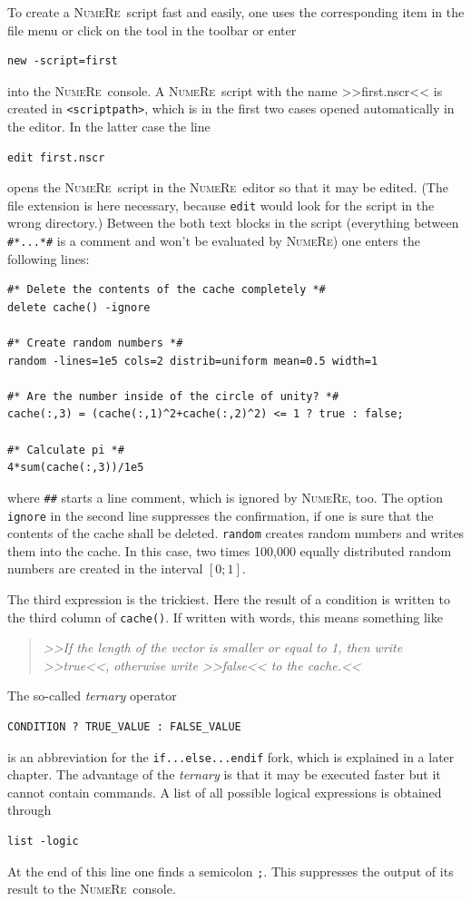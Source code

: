 \documentclass[DIV=14,headsepline,footsepline]{scrbook}
\newcommand{\NR}{\textsc{Nu\-me\-Re}}
\begin{document}
				To create a \NR\ script fast and easily, one uses the corresponding item in the file menu or click on the tool in the toolbar or enter 
				\begin{lstlisting}
new -script=first
				\end{lstlisting}
				into the \NR\ console. A \NR\ script with the name >>first.nscr<< is created in \verb+<scriptpath>+, which is in the first two cases opened automatically in the editor. In the latter case the line
				\begin{lstlisting}
edit first.nscr
				\end{lstlisting}
				opens the \NR\ script in the \NR\ editor so that it may be edited. (The file extension is here necessary, because \verb+edit+ would look for the script in the wrong directory.) Between the both text blocks in the script (everything between \verb+#*...*#+ is a comment and won't be evaluated by \NR) one enters the following lines:
				\begin{lstlisting}
#* Delete the contents of the cache completely *#
delete cache() -ignore

#* Create random numbers *#
random -lines=1e5 cols=2 distrib=uniform mean=0.5 width=1

#* Are the number inside of the circle of unity? *#
cache(:,3) = (cache(:,1)^2+cache(:,2)^2) <= 1 ? true : false;

#* Calculate pi *#
4*sum(cache(:,3))/1e5
				\end{lstlisting}
				where \verb+##+ starts a line comment, which is ignored by \NR, too. The option \verb+ignore+ in the second line suppresses the confirmation, if one is sure that the contents of the cache shall be deleted. \verb+random+ creates random numbers and writes them into the cache. In this case, two times 100,000 equally distributed random numbers are created in the interval $[0;1]$.
				
				The third expression is the trickiest. Here the result of a condition is written to the third column of \verb+cache()+. If written with words, this means something like
				\begin{quotation}
					\noindent\emph{>>If the length of the vector is smaller or equal to 1, then write >>true<<, otherwise write >>false<< to the cache.<<}
				\end{quotation}
				The so-called \emph{ternary} operator
				\begin{lstlisting}
CONDITION ? TRUE_VALUE : FALSE_VALUE
				\end{lstlisting}
				is an abbreviation for the \verb+if...else...endif+ fork, which is explained in a later chapter. The advantage of the \emph{ternary} is that it may be executed faster but it cannot contain commands. A list of all possible logical expressions is obtained through
				\begin{lstlisting}
list -logic
				\end{lstlisting}
				At the end of this line one finds a semicolon \verb+;+. This suppresses the output of its result to the \NR\ console.
				
\end{document}
